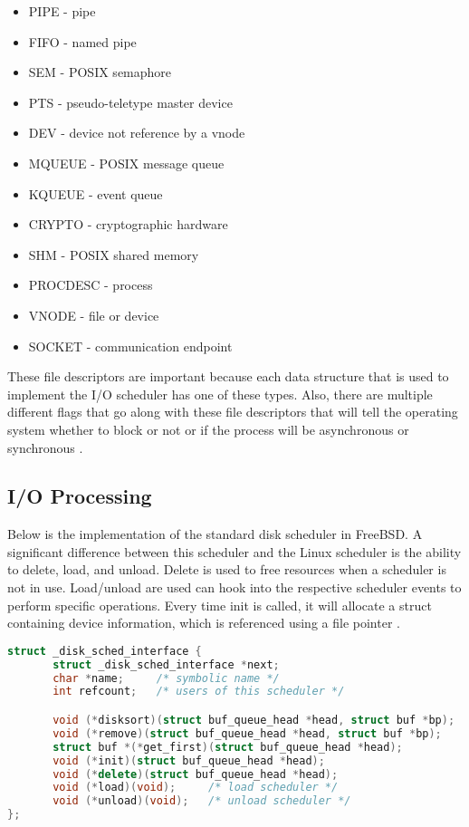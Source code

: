 \documentclass[letterpaper,draftclsnofoot,10pt,onecolumn,titlepage]{IEEEtran}\usepackage[margin=0.75in]{geometry}
\begin{document}
\begin{itemize}
\item  PIPE - pipe
\item  FIFO - named pipe
\item  SEM - POSIX semaphore
\item  PTS - pseudo-teletype master device
\item  DEV - device not reference by a vnode
\item  MQUEUE - POSIX message queue
\item  KQUEUE - event queue
\item  CRYPTO - cryptographic hardware
\item  SHM - POSIX shared memory
\item  PROCDESC - process
\item  VNODE - file or device
\item  SOCKET - communication endpoint
\end{itemize}

These file descriptors are important because each data structure that is used to implement the 
I/O scheduler has one of these types. Also, there are multiple different flags that go along 
with these file descriptors that will tell the operating system whether to block or not or if 
the process will be asynchronous or synchronous \cite{FreeBSDBook}.

\subsection{I/O Processing}
Below is the implementation of the standard disk scheduler in FreeBSD. A significant difference between 
this scheduler and the Linux scheduler is the ability to delete, load, and unload. Delete is used to free
resources when a scheduler is not in use. Load/unload are used can hook into the respective scheduler events
to perform specific operations. Every time init is called, it will allocate a struct containing device 
information, which is referenced using a file pointer \cite{FreeBSDBook}.

\begin{lstlisting}[language=C++]
struct _disk_sched_interface {
       struct _disk_sched_interface *next;
       char *name;     /* symbolic name */
       int refcount;   /* users of this scheduler */

       void (*disksort)(struct buf_queue_head *head, struct buf *bp);
       void (*remove)(struct buf_queue_head *head, struct buf *bp);
       struct buf *(*get_first)(struct buf_queue_head *head);
       void (*init)(struct buf_queue_head *head);
       void (*delete)(struct buf_queue_head *head);
       void (*load)(void);     /* load scheduler */
       void (*unload)(void);   /* unload scheduler */
};
\end{lstlisting}\cite{FreeBSD}
\end{document}
